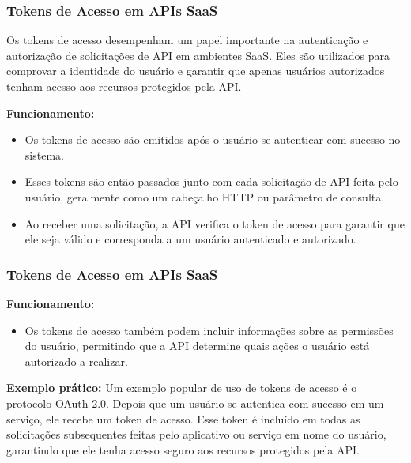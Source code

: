 \documentclass{beamer}
\begin{document}
\begin{frame}
	\frametitle{Tokens de Acesso em APIs SaaS }

	Os tokens de acesso desempenham um papel importante na autenticação e autorização de solicitações de API em ambientes SaaS. Eles são utilizados para comprovar a identidade do usuário e garantir que apenas usuários autorizados tenham acesso aos recursos protegidos pela API.

	\textbf{Funcionamento:}
	\begin{itemize}
		\item Os tokens de acesso são emitidos após o usuário se autenticar com sucesso no sistema.
		\item Esses tokens são então passados junto com cada solicitação de API feita pelo usuário, geralmente como um cabeçalho HTTP ou parâmetro de consulta.
		\item Ao receber uma solicitação, a API verifica o token de acesso para garantir que ele seja válido e corresponda a um usuário autenticado e autorizado.
	\end{itemize}

\end{frame}

\begin{frame}
	\frametitle{Tokens de Acesso em APIs SaaS}

	\textbf{Funcionamento:}
	\begin{itemize}
		\item Os tokens de acesso também podem incluir informações sobre as permissões do usuário, permitindo que a API determine quais ações o usuário está autorizado a realizar.
	\end{itemize}

	\textbf{Exemplo prático:} Um exemplo popular de uso de tokens de acesso é o protocolo OAuth 2.0. Depois que um usuário se autentica com sucesso em um serviço, ele recebe um token de acesso. Esse token é incluído em todas as solicitações subsequentes feitas pelo aplicativo ou serviço em nome do usuário, garantindo que ele tenha acesso seguro aos recursos protegidos pela API.

\end{frame}
\end{document}
